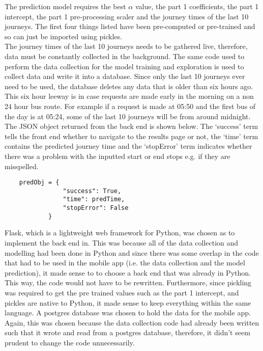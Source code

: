 The prediction model requires the best $\alpha$ value, the part 1 coefficients, the part 1 intercept, the part 1 pre-processing scaler and the journey times of the last 10 journeys. The first four things listed have been pre-computed or pre-trained and so can just be imported using pickles.\\ 

The journey times of the last 10 journeys needs to be gathered live, therefore, data must be constantly collected in the background. The same code used to perform the data collection for the model training and exploration is used to collect data and write it into a database. Since only the last 10 journeys ever need to be used, the database deletes any data that is older than six hours ago. This six hour leeway is in case requests are made early in the morning on a non 24 hour bus route. For example if a request is made at 05:50 and the first bus of the day is at 05:24, some of the last 10 journeys will be from around midnight. \\

The JSON object returned from the back end is shown below. The `success' term tells the front end whether to navigate to the results page or not, the `time' term contains the predicted journey time and the `stopError' term indicates whether there was a problem with the inputted start or end stops e.g. if they are misspelled.

\begin{lstlisting}
    predObj = {
                "success": True,
                "time": predTime,
                "stopError": False
            }
\end{lstlisting}


Flask, which is a lightweight web framework for Python, was chosen as to implement the back end in. This was because all of the data collection and modelling had been done in Python and since there was some overlap in the code that had to be used in the mobile app (i.e. the data collection and the model prediction), it made sense to to choose a back end that was already in Python. This way, the code would not have to be rewritten. Furthermore, since pickling was required to get the pre trained values such as the part 1 intercept, and pickles are native to Python, it made sense to keep everything within the same language. A postgres database was chosen to hold the data for the mobile app. Again, this was chosen because the data collection code had already been written such that it wrote and read from a postgres database, therefore, it didn't seem prudent to change the code unnecessarily. \\

\clearpage